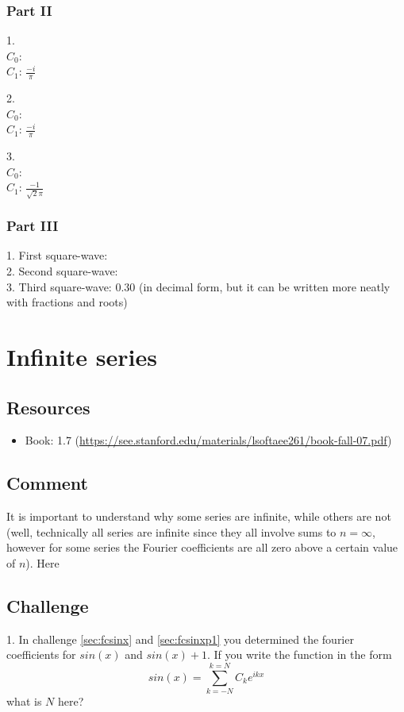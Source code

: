 \subsubsection*{Part II}
1.\\
$C_0$: \\
$C_1$: $\displaystyle \frac{-i}{\pi}$

2.\\
$C_0$: \\
$C_1$: $\displaystyle \frac{-i}{\pi}$

3.\\
$C_0$: \\
$C_1$: $\displaystyle \frac{-1}{\sqrt{2}\pi}$

\subsubsection*{Part III}
1. First square-wave: \\
2. Second square-wave: \\
3. Third square-wave: 0.30 (in decimal form, but it can be written more neatly with fractions and roots)




\newpage
\section{Infinite series}

\subsection*{Resources}
\begin{itemize}
    \item Book: 1.7 (\url{https://see.stanford.edu/materials/lsoftaee261/book-fall-07.pdf})
\end{itemize}

\subsection*{Comment}
It is important to understand why some series are infinite, while others are not (well, technically all series are infinite since they all involve sums to $n=\infty$, however for some series the Fourier coefficients are all zero above a certain value of $n$). Here

\subsection*{Challenge}
1. In challenge \ref{sec:fcsinx} and \ref{sec:fcsinxp1} you determined the fourier coefficients for $sin(x)$ and $sin(x)+1$. If you write the function in the form
\begin{equation}
    \label{eq:sinxform}
    sin(x)=\sum_{k=-N}^{k=N} C_k e^{i k x}
\end{equation}
what is $N$ here?

